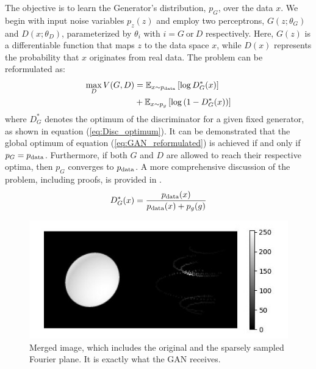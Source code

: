 The objective is to learn the Generator's distribution, \(p_G\), over the data \(x\). We begin with input noise variables \(p_z(z)\) and employ two perceptrons, \(G(z; \theta_G)\) and \(D(x; \theta_D)\), parameterized by \(\theta_i\) with \(i = G \ \mathrm{or}\ D\) respectively. Here, \(G(z)\) is a differentiable function that maps \(z\) to the data space \(x\), while \(D(x)\) represents the probability that \(x\) originates from real data. The problem can be reformulated as:
\begin{equation}
	\centering
	\begin{aligned}
		\max_{D} V(G, D) &= \mathbb{E}_{x \sim p_{\rm data}} \left[ \log D^{*}_{G}(x) \right] \\ 
		&+ \mathbb{E}_{x \sim p_{g}} \left[ \log \left( 1 - D^{*}_{G}(x) \right) \right]
	\end{aligned}
	\label{eq:GAN_reformulated}
\end{equation}
where \(D^{*}_{G}\) denotes the optimum of the discriminator for a given fixed generator, as shown in equation (\ref{eq:Disc_optimum}). It can be demonstrated that the global optimum of equation (\ref{eq:GAN_reformulated}) is achieved if and only if \(p_G = p_{\rm data}\). Furthermore, if both \(G\) and \(D\) are allowed to reach their respective optima, then \(p_G\) converges to \(p_{\rm data}\). A more comprehensive discussion of the problem, including proofs, is provided in \cite{goodfellow2014generative}.
\begin{equation}
	\centering
	D^*_G(x) = \frac{p_{\rm data}(x)}{p_{\rm data}(x) + p_g(g)}
	\label{eq:Disc_optimum}
\end{equation}
\begin{figure}
	\centering
	\includegraphics[width=\linewidth]{fig/ellipse1612.jpg}
	\caption{Merged image, which includes the original and the sparsely sampled Fourier plane. It is exactly what the GAN receives. }
	\label{fig:GANinput}
\end{figure}
